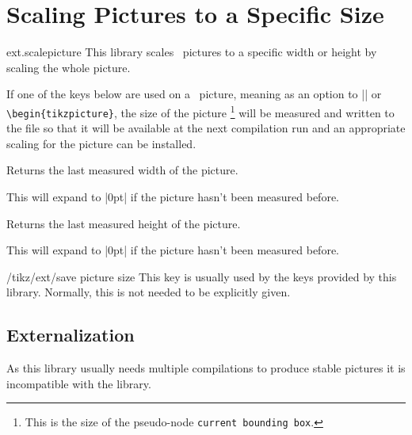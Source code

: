 %
%
%
\clearpage
\section{Scaling Pictures to a Specific Size}
\label{library:scalepicture}

\begin{tikzlibrary}{ext.scalepicture}
  This library scales \tikzname\ pictures to a specific width or height
  by scaling the whole picture.
\end{tikzlibrary}

\begin{multicols}{2}
If one of the keys below are used on a \tikzname\ picture, meaning
as an option to |\tikzpicture| or \texttt{\textbackslash begin\{tikzpicture\}},
the size of the picture%
\footnote{This is the size of the pseudo-node \texttt{current bounding box}.}
will be measured and written to the  file
so that it will be available at the next compilation run
and an appropriate scaling for the picture can be installed.

\begin{command}{\tikzextpicturewidth}
  Returns the last measured width of the picture.
  
  This will expand to |0pt| if the picture hasn't been measured before.
\end{command}
\begin{command}{\tikzextpictureheight}
  Returns the last measured height of the picture.
  
  This will expand to |0pt| if the picture hasn't been measured before.
\end{command}

\begin{stylekey}{/tikz/ext/save picture size}
  This key is usually used by the keys provided by this library.
  Normally, this is not needed to be explicitly given.
\end{stylekey}

\subsection{Externalization}
As this library usually needs multiple compilations
to produce stable pictures it is incompatible
with the  library.


\end{multicols}
